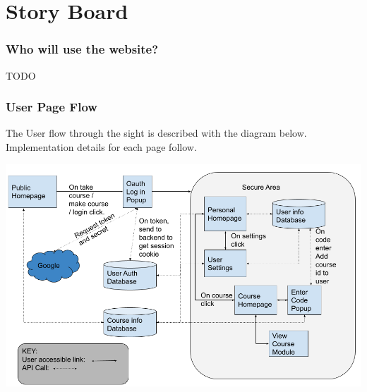 \documentclass{article}
\begin{document}
\section{Story Board}
\subsubsection{Who will use the website?}
TODO

\subsubsection{User Page Flow}
The User flow through the sight is described with the diagram below.
Implementation details for each page follow.

\includegraphics[width=\textwidth]{flow}

\newpage
\end{document}
